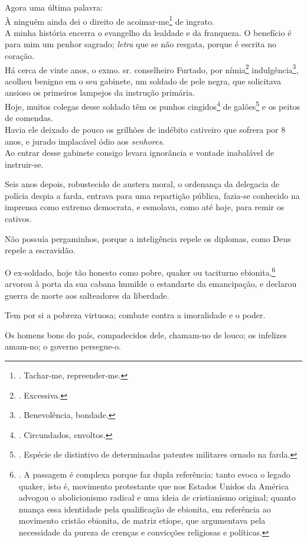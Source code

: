 Agora uma última palavra:\\
À ninguém ainda dei o direito de acoimar-me\footnote{. Tachar-me,
  repreender-me.} de ingrato.\\
A minha história encerra o evangelho da lealdade e da franqueza. O
benefício é para mim um penhor sagrado; \emph{letra} que se não resgata,
porque é escrita no coração.\\
Há cerca de vinte anos, o exmo. sr. conselheiro Furtado, por
nímia\footnote{. Excessiva.} indulgência\footnote{. Benevolência,
  bondade.}, acolheu benigno em o seu gabinete, um soldado de pele
negra, que solicitava ansioso os primeiros lampejos da instrução
primária.\\
Hoje, muitos colegas desse soldado têm os punhos cingidos\footnote{.
  Circundados, envoltos.} de galões\footnote{. Espécie de distintivo de
  determinadas patentes militares ornado na farda.} e os peitos de
comendas.\\
Havia ele deixado de pouco os grilhões de indébito cativeiro que sofrera
por 8 anos, e jurado implacável ódio aos \emph{senhores}.\\
Ao entrar desse gabinete consigo levara ignorância e vontade inabalável
de instruir-se.

Seis anos depois, robustecido de austera moral, o ordenança da delegacia
de polícia despia a farda, entrava para uma repartição pública, fazia-se
conhecido na imprensa como extremo democrata, e esmolava, como até hoje,
para remir os cativos.

Não possuía pergaminhos, porque a inteligência repele os diplomas, como
Deus repele a escravidão.

O ex-soldado, hoje tão honesto como pobre, quaker ou taciturno
ebionita,\footnote{. A passagem é complexa porque faz dupla referência:
  tanto evoca o legado quaker, isto é, movimento protestante que nos
  Estados Unidos da América advogou o abolicionismo radical e uma ideia
  de cristianismo original; quanto nuança essa identidade pela
  qualificação de ebionita, em referência ao movimento cristão ebionita,
  de matriz etíope, que argumentava pela necessidade da pureza de
  crenças e convicções religiosas e políticas.} arvorou à porta da sua
cabana humilde o estandarte da emancipação, e declarou guerra de morte
aos salteadores da liberdade.

Tem por si a pobreza virtuosa; combate contra a imoralidade e o poder.

Os homens bons do país, compadecidos dele, chamam-no de louco; os
infelizes amam-no; o governo persegue-o.

